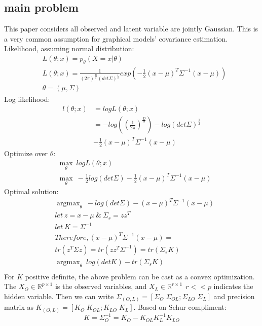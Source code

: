 \documentclass[10pt,conference]{IEEEtran}
\DeclareMathOperator*{\argmax}{argmax}
\begin{document}
\subsection*{main problem}
This paper \cite{Chandra_1} considers all observed and latent variable are jointly Gaussian. This is a very common assumption for graphical models' covariance estimation.
Likelihood, assuming normal distribution:
\begin{align*}
  &L(\theta;x) = p_{\theta}(X=x | \theta)\\
  &L(\theta;x) = \frac{1}{(2\pi)^{\frac{D}{2}} (det \Sigma)^{\frac{1}{2}}} exp(-\frac{1}{2}(x-\mu)^T\Sigma^{-1}(x-\mu))\\
  &\theta = (\mu,\Sigma)
\end{align*}
Log likelihood:
\begin{align*}
  l(\theta;x) & = log L(\theta;x)\\
              & = -log((\frac{1}{2 \pi})^{\frac{D}{2}}) - log(det \Sigma)^{\frac{1}{2}}\\
              & - \frac{1}{2}(x-\mu)^T \Sigma^{-1}(x-\mu)
\end{align*}
Optimize over $\theta$:
\begin{align*}
  & \max_{\theta}\ log L(\theta;x)\\
  & \max_{\theta}\ - \frac{1}{2} log(det \Sigma) - \frac{1}{2}(x-\mu)^T \Sigma^{-1}(x-\mu)
\end{align*}
Optimal solution:
\begin{align*}
  & \argmax_{\theta}\ -log(det \Sigma) - (x-\mu)^T \Sigma^{-1}(x-\mu)\\
  &let\ z= x-\mu\ \& \ \Sigma_{s}= zz^T\\
  &let\ K = \Sigma^{-1}\\
  & Therefore, (x-\mu)^T \Sigma^{-1}(x-\mu) = \\
  & tr(z^T \Sigma z) = tr(zz^T \Sigma^{-1}) = tr(\Sigma_{s} K)\\
  & \argmax_{\theta}\ log(det K) - tr(\Sigma_{s} K)\\
\end{align*}
For $K$ positive definite, the above problem can be cast as a convex optimization.\\
 The $X_O \in \mathbb{R}^{p \times 1}$ is the observed variables, and $X_L \in \mathbb{R}^{r \times 1} \:\: r<<p$ indicates the hidden variable. Then we can write $\Sigma_{(O,L)}=[\Sigma_O \; \Sigma_{OL}; \Sigma_{LO} \; \Sigma_L]$ and precision matrix as $K_{(O,L)}=[K_O \; K_{OL}; K_{LO} \; K_L]$. Based on Schur compliment:
 \begin{equation}
     K = \Sigma_O^{-1} = K_O - K_{OL} K_L^{-1} K_{LO}
 \end{equation}
\end{document}
